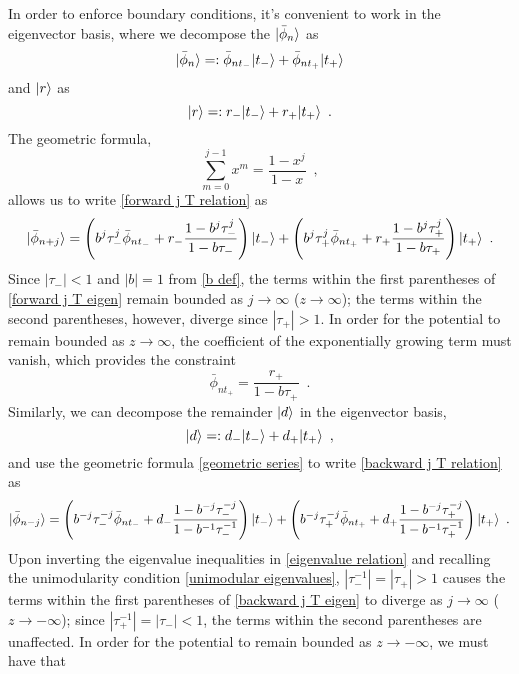 \documentclass{article}
\newcommand{\lp}{\left(}
\newcommand{\rp}{\right)}
\DeclarePairedDelimiter\ket{\lvert}{\rangle}
\begin{document}
In order to enforce boundary conditions, it's convenient to work in the eigenvector basis, where we decompose the $\ket{\bar\phi_n}$ as
\begin{equation}
    \label{eigen decomp phi}
    \ket{\bar\phi_n}=:\bar\phi_{n t_-}\ket{t_-} + \bar\phi_{nt_+}\ket{t_+}
\end{equation}
and $\ket r$ as
\begin{equation}
    \label{eigen decomp r}
    \ket r =: r_-\ket{t_-}+r_+\ket{t_+}
    \,\,\,.
\end{equation}
The geometric formula,
\begin{equation}
    \label{geometric series}
    \sum_{m=0}^{j-1} x^m = \frac{1-x^j}{1-x}
    \,\,\,,
\end{equation}
allows us to write \eqref{forward j T relation} as
\begin{equation}
    \label{forward j T eigen}
    \ket{\bar\phi_{n+j}} = 
    \lp 
    b^j \tau_-^j\bar\phi_{nt_-} + r_-\frac{1-b^j\tau_-^j}{1-b\tau_-}
    \rp\ket{t_-}
    +
    \lp
    b^j\tau_+^j\bar\phi_{nt_+}+r_+\frac{1-b^j\tau_+^j}{1-b\tau_+}
    \rp\ket{t_+}
    \,\,\,.
\end{equation}
Since $|\tau_-|<1$ and $|b|=1$ from \eqref{b def}, the terms within the first parentheses of \eqref{forward j T eigen} remain bounded as $j\to\infty$ ($z\to\infty$); the terms within the second parentheses, however, diverge since $|\tau_+|>1$.  In order for the potential to remain bounded as $z\to\infty$, the coefficient of the exponentially growing term must vanish, which provides the constraint
\begin{equation}
    \label{forward BC}
    \bar\phi_{nt_+}=\frac{r_+}{1-b\tau_+}
    \,\,\,.
\end{equation}
Similarly, we can decompose the remainder $\ket d$ in the eigenvector basis,
\begin{equation}
    \label{eigen decomp d}
    \ket d=:d_-\ket{t_-} + d_+\ket{t_+}
    \,\,\,,
\end{equation}
and use the geometric formula \eqref{geometric series} to write \eqref{backward j T relation} as
\begin{equation}
    \label{backward j T eigen}
    \ket{\bar\phi_{n-j}} = 
    \lp
    b^{-j}\tau_-^{-j}\bar\phi_{nt_-} + d_- \frac{1-b^{-j}\tau_-^{-j}}{1-b^{-1}\tau_-^{-1}}
    \rp
    \ket{t_-}
    +
    \lp
    b^{-j}\tau_+^{-j}\bar\phi_{nt_+}
    +
    d_+\frac{1-b^{-j}\tau_+^{-j}}{1-b^{-1}\tau_+^{-1}}
    \rp
    \ket{t_+}
    \,\,\,.
\end{equation}
Upon inverting the eigenvalue inequalities in \eqref{eigenvalue relation} and recalling the unimodularity condition \eqref{unimodular eigenvalues}, $|\tau_-^{-1}|=|\tau_+|>1$ causes the terms within the first parentheses of \eqref{backward j T eigen} to diverge as $j\to\infty$ ($z\to-\infty$); since $|\tau_+^{-1}|=|\tau_-|<1$, the terms within the second parentheses are unaffected.  In order for the potential to remain bounded as $z\to-\infty$, we must have that
\end{document}
